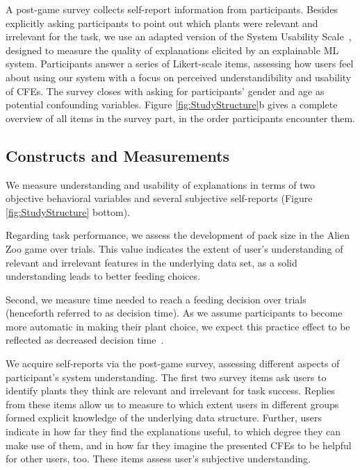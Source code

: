 A post-game survey collects self-report information from participants.
Besides explicitly asking participants to point out which plants were relevant and irrelevant for the task, we use an adapted version of the System Usability Scale~\citep{holzinger_measuring_2020}, designed to measure the quality of explanations elicited by an explainable \gls{ML} system.
Participants answer a series of Likert-scale items, assessing how users feel about using our system with a focus on perceived understandibility and usability of \glspl{CFE}.
The survey closes with asking for participants' gender and age as potential confounding variables.
Figure \ref{fig:StudyStructure}b gives a complete overview of all items in the survey part, in the order participants encounter them.

\subsection{Constructs and Measurements}

We measure understanding and usability of explanations in terms of two objective behavioral variables and several subjective self-reports (Figure \ref{fig:StudyStructure} bottom). 

Regarding task performance, we assess the development of pack size in the Alien Zoo game over trials. 
This value indicates the extent of user's understanding of relevant and irrelevant features in the underlying data set, as a solid understanding leads to better feeding choices. 

Second, we measure time needed to reach a feeding decision over trials (henceforth referred to as decision time). As we assume participants to become more automatic in making their plant choice, we expect this practice effect to be reflected as decreased decision time~\citep{logan_shapes_1992}. 

We acquire self-reports via the post-game survey, assessing different aspects of participant's system understanding. 
The first two survey items ask users to identify plants they think are relevant and irrelevant for task success. 
Replies from these items allow us to measure to which extent users in different groups formed explicit knowledge of the underlying data structure. 
Further, users indicate in how far they find the explanations useful, to which degree they can make use of them, and in how far they imagine the presented \glspl{CFE} to be helpful for other users, too. These items assess user's subjective understanding.

